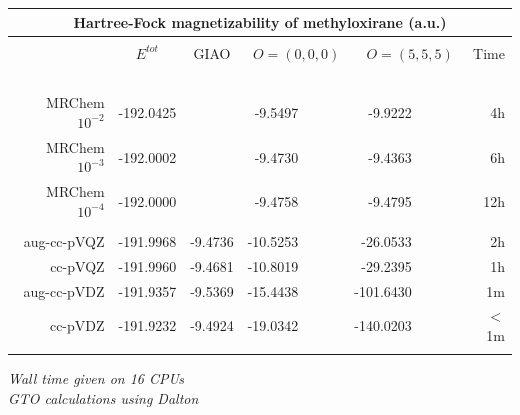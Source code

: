 \begin{frame}
\begin{table}
\centering
\begin{tabular}{r|c|crrr}
\multicolumn{6}{c}{\textbf{Hartree-Fock magnetizability of methyloxirane (a.u.)}}\\
\hline
\hline
                     &               &               &                     &                     &               \\
                     &$E^{tot}$      & GIAO          & $O=(0,0,0)$         & $O=(5,5,5)$         &Time           \\
    \hspace{15mm}\   &\hspace{15mm}\ &\hspace{15mm}\ &\hspace{15mm}\       &\hspace{15mm}\       &\hspace{05mm}\ \\
    MRChem $10^{-2}$ & -192.0425     &               &  -9.5497\ \ \ \ \ \ &  -9.9222\ \ \ \ \ \ &    4h         \\
    MRChem $10^{-3}$ & -192.0002     &               &  -9.4730\ \ \ \ \ \ &  -9.4363\ \ \ \ \ \ &    6h         \\
    MRChem $10^{-4}$ & -192.0000     &               &  -9.4758\ \ \ \ \ \ &  -9.4795\ \ \ \ \ \ &   12h         \\
                     &               &               &                     &                     &               \\
    aug-cc-pVQZ      & -191.9968     & -9.4736       & -10.5253\ \ \ \ \ \ & -26.0533\ \ \ \ \ \ &    2h         \\
	cc-pVQZ      & -191.9960     & -9.4681       & -10.8019\ \ \ \ \ \ & -29.2395\ \ \ \ \ \ &    1h         \\
    aug-cc-pVDZ      & -191.9357     & -9.5369       & -15.4438\ \ \ \ \ \ &-101.6430\ \ \ \ \ \ &    1m         \\
	cc-pVDZ      & -191.9232     & -9.4924       & -19.0342\ \ \ \ \ \ &-140.0203\ \ \ \ \ \ &    $<$1m      \\
                     &               &               &                     &                     &               \\
\hline
\hline
\end{tabular}
\end{table}

\centering
\scriptsize
\it{Wall time given on 16 CPUs}\\
\it{GTO calculations using Dalton}

\end{frame}


